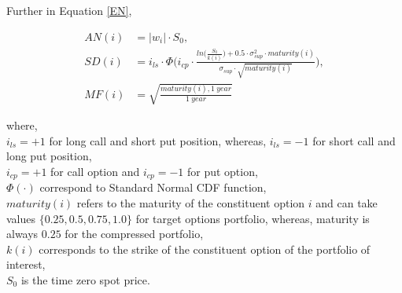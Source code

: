 \noindent Further in Equation \ref{EN}, 

\begin{align}
AN(i) &= |w_i| \cdot S_0, \\
SD(i) &= i_{ls} \cdot \Phi\Big(i_{cp} \cdot \frac{ln\big(\frac{S_0}{k(i)}\big) + 0.5 \cdot \sigma_{sup}^{2} \cdot maturity(i)}{\sigma_{sup} \cdot \sqrt{maturity(i)}}\Big), \\
MF(i) &= \sqrt{\frac{maturity(i), 1 \ year}{1 \ year}}
\end{align}

\noindent where,\\  
$i_{ls} = +1$ for long call and short put position, whereas, $i_{ls} = -1$ for short call and long put position, \\ 
$i_{cp}=+1$ for call option and $i_{cp}=-1$ for put option, \\ 
$\Phi(\cdot)$ correspond to Standard Normal CDF function, \\
$maturity(i)$ refers to the maturity of the constituent option $i$ and can take values $\{0.25, 0.5, 0.75, 1.0\}$ for target options portfolio, whereas, maturity is always $0.25$ for the compressed portfolio, \\
$k(i)$ corresponds to the strike of the constituent option of the portfolio of interest, \\
$S_0$ is the time zero spot price. \\

